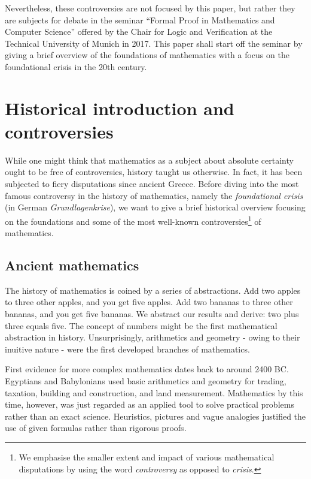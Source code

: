 \documentclass[hidelinks]{article}
\theoremstyle{plain}
\theoremstyle{definition}
\theoremstyle{rem}
\begin{document}
Nevertheless, these controversies are not focused by this paper, but rather they are subjects for debate in the seminar ``Formal Proof in Mathematics and Computer Science'' offered by the Chair for Logic and Verification at the Technical University of Munich in 2017. This paper shall start off the seminar by giving a brief overview of the foundations of mathematics with a focus on the foundational crisis in the 20th century.
\newpage

\tableofcontents 
\newpage

\section{Historical introduction and controversies}
While one might think that mathematics as a subject about absolute certainty ought to be free of controversies, history taught us otherwise. In fact, it has been subjected to fiery disputations since ancient Greece. Before diving into the most famous controversy in the history of mathematics, namely the \textit{foundational crisis} (in German \textit{Grundlagenkrise}), we want to give a brief historical overview focusing on the foundations and some of the most well-known controversies\footnote{We emphasise the smaller extent and impact of various mathematical disputations by using the word \textit{controversy} as opposed to \textit{crisis}.} of mathematics.

\subsection{Ancient mathematics}

The history of mathematics is coined by a series of abstractions.
Add two apples to three other apples, and you get five apples. Add two bananas to three other bananas, and you get five bananas. We abstract our results and derive: two plus three equals five. The concept of numbers might be the first mathematical abstraction in history. Unsurprisingly, arithmetics and geometry - owing to their inuitive nature - were the first developed branches of mathematics.

First evidence for more complex mathematics dates back to around 2400 BC\@. Egyptians and Babylonians used basic arithmetics and geometry for trading, taxation, building and construction, and land measurement. Mathematics by this time, however, was just regarded as an applied tool to solve practical problems rather than an exact science. Heuristics, pictures and vague analogies justified the use of given formulas rather than rigorous proofs.
\end{document}
